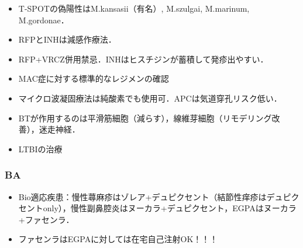 \begin{itemize}
\item T-SPOTの偽陽性はM.kansasii（有名）, M.szulgai, M.marinum, M.gordonae．
\item RFPとINHは減感作療法．
\item RFP+VRCZ併用禁忌．INHはヒスチジンが蓄積して発疹出やすい．

\end{itemize}

\begin{itemize}
\item MAC症に対する標準的なレジメンの確認
\item マイクロ波凝固療法は純酸素でも使用可．APCは気道穿孔リスク低い．
\item BTが作用するのは平滑筋細胞（減らす），線維芽細胞（リモデリング改善），迷走神経．
\item LTBIの治療


\end{itemize}

\subsubsection{BA}

\begin{itemize}

\item Bio適応疾患：慢性蕁麻疹はゾレア+デュピクセント（結節性痒疹はデュピクセントonly），慢性副鼻腔炎はヌーカラ+デュピクセント，EGPAはヌーカラ+ファセンラ．
\item ファセンラはEGPAに対しては在宅自己注射OK！！！


\end{itemize}

